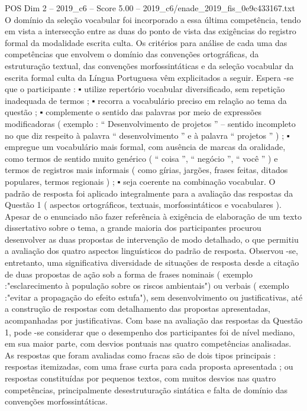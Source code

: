 \begin{textsample}{POS Dim 2 – 2019\_c6 – Score 5.00 – 2019\_c6/enade\_2019\_fis\_0e9c433167.txt}
O domínio da seleção vocabular foi incorporado a essa última competência, tendo em vista a intersecção entre as duas do ponto de vista das exigências do registro formal da modalidade escrita culta.
Os critérios para análise de cada uma das competências que envolvem o domínio das convenções ortográficas, da estruturação textual, das convenções morfossintáticas e da seleção vocabular da escrita formal culta da Língua Portuguesa vêm explicitados a seguir.
Espera -se que o participante : {\EmojiFont ▪} utilize repertório vocabular diversificado, sem repetição inadequada de termos ; {\EmojiFont ▪} recorra a vocabulário preciso em relação ao tema da questão ; {\EmojiFont ▪} complemente o sentido das palavras por meio de expressões modificadoras ( exemplo : “ Desenvolvimento de projetos ” – sentido incompleto no que diz respeito à palavra “ desenvolvimento ” e à palavra “ projetos ” ) ; {\EmojiFont ▪} empregue um vocabulário mais formal, com ausência de marcas da oralidade, como termos de sentido muito genérico ( “ coisa ”, “ negócio ”, “ você ” ) e termos de registros mais informais ( como gírias, jargões, frases feitas, ditados populares, termos regionais ) ; {\EmojiFont ▪} seja coerente na combinação vocabular.
O padrão de resposta foi aplicado integralmente para a avaliação das respostas da Questão 1 ( aspectos ortográficos, textuais, morfossintáticos e vocabulares ).
Apesar de o enunciado não fazer referência à exigência de elaboração de um texto dissertativo sobre o tema, a grande maioria dos participantes procurou desenvolver as duas propostas de intervenção de modo detalhado, o que permitiu a avaliação dos quatro aspectos linguísticos do padrão de resposta.
Observou -se, entretanto, uma significativa diversidade de situações de resposta desde a citação de duas propostas de ação sob a forma de frases nominais ( exemplo :"esclarecimento à população sobre os riscos ambientais") ou verbais ( exemplo :"evitar a propagação do efeito estufa"), sem desenvolvimento ou justificativas, até a construção de respostas com detalhamento das propostas apresentadas, acompanhadas por justificativas.
Com base na avaliação das respostas da Questão 1, pode -se considerar que o desempenho dos participantes foi de nível mediano, em sua maior parte, com desvios pontuais nas quatro competências analisadas.
As respostas que foram avaliadas como fracas são de dois tipos principais : respostas itemizadas, com uma frase curta para cada proposta apresentada ; ou respostas constituídas por pequenos textos, com muitos desvios nas quatro competências, principalmente desestruturação sintática e falta de domínio das convenções morfossintáticas.

\end{textsample}
